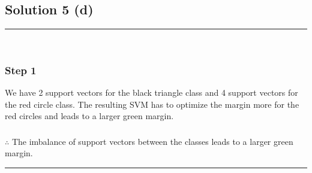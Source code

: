 \documentclass{article}
\begin{document}
\newpage

\subsection*{Solution 5 (d)}
\noindent\rule{\textwidth}{0.4pt}\\

\subsubsection*{Step 1}
\parbox{\textwidth}{
We have 2 support vectors for the black triangle class and 4 support vectors for the red circle class.
The resulting SVM has to optimize the margin more for the red circles and leads to a larger green margin.
}

\subsubsection*{\normalfont}{$\therefore$ The imbalance of support vectors between the classes leads to a larger green margin.}

\noindent\rule{\textwidth}{0.4pt}\\
\end{document}
